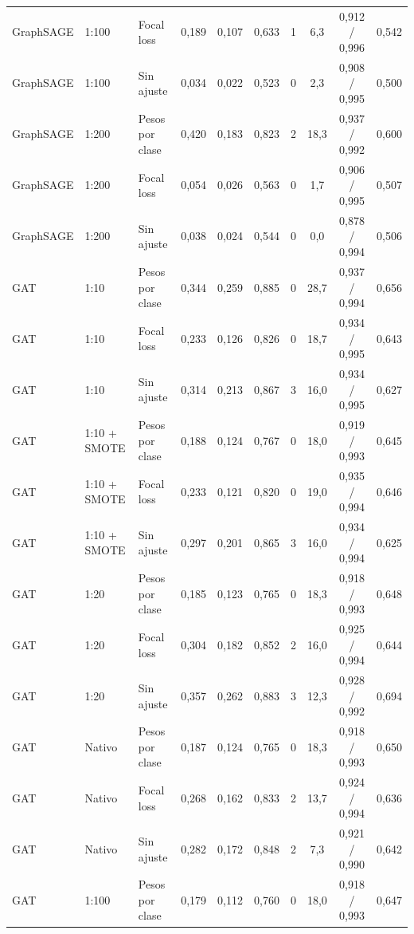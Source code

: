 \begin{longtable}{lllccccccc}
GraphSAGE & 1:100 & Focal loss & 0{,}189 & 0{,}107 & 0{,}633 & 1 & 6{,}3 & 0{,}912 / 0{,}996 & 0{,}542 \\
GraphSAGE & 1:100 & Sin ajuste & 0{,}034 & 0{,}022 & 0{,}523 & 0 & 2{,}3 & 0{,}908 / 0{,}995 & 0{,}500 \\
GraphSAGE & 1:200 & Pesos por clase & 0{,}420 & 0{,}183 & 0{,}823 & 2 & 18{,}3 & 0{,}937 / 0{,}992 & 0{,}600 \\
GraphSAGE & 1:200 & Focal loss & 0{,}054 & 0{,}026 & 0{,}563 & 0 & 1{,}7 & 0{,}906 / 0{,}995 & 0{,}507 \\
GraphSAGE & 1:200 & Sin ajuste & 0{,}038 & 0{,}024 & 0{,}544 & 0 & 0{,}0 & 0{,}878 / 0{,}994 & 0{,}506 \\
\midrule
GAT & 1:10 & Pesos por clase & 0{,}344 & 0{,}259 & 0{,}885 & 0 & 28{,}7 & 0{,}937 / 0{,}994 & 0{,}656 \\
GAT & 1:10 & Focal loss & 0{,}233 & 0{,}126 & 0{,}826 & 0 & 18{,}7 & 0{,}934 / 0{,}995 & 0{,}643 \\
GAT & 1:10 & Sin ajuste & 0{,}314 & 0{,}213 & 0{,}867 & 3 & 16{,}0 & 0{,}934 / 0{,}995 & 0{,}627 \\
GAT & 1:10 + SMOTE & Pesos por clase & 0{,}188 & 0{,}124 & 0{,}767 & 0 & 18{,}0 & 0{,}919 / 0{,}993 & 0{,}645 \\
GAT & 1:10 + SMOTE & Focal loss & 0{,}233 & 0{,}121 & 0{,}820 & 0 & 19{,}0 & 0{,}935 / 0{,}994 & 0{,}646 \\
GAT & 1:10 + SMOTE & Sin ajuste & 0{,}297 & 0{,}201 & 0{,}865 & 3 & 16{,}0 & 0{,}934 / 0{,}994 & 0{,}625 \\
GAT & 1:20 & Pesos por clase & 0{,}185 & 0{,}123 & 0{,}765 & 0 & 18{,}3 & 0{,}918 / 0{,}993 & 0{,}648 \\
GAT & 1:20 & Focal loss & 0{,}304 & 0{,}182 & 0{,}852 & 2 & 16{,}0 & 0{,}925 / 0{,}994 & 0{,}644 \\
GAT & 1:20 & Sin ajuste & 0{,}357 & 0{,}262 & 0{,}883 & 3 & 12{,}3 & 0{,}928 / 0{,}992 & 0{,}694 \\
GAT & Nativo & Pesos por clase & 0{,}187 & 0{,}124 & 0{,}765 & 0 & 18{,}3 & 0{,}918 / 0{,}993 & 0{,}650 \\
GAT & Nativo & Focal loss & 0{,}268 & 0{,}162 & 0{,}833 & 2 & 13{,}7 & 0{,}924 / 0{,}994 & 0{,}636 \\
GAT & Nativo & Sin ajuste & 0{,}282 & 0{,}172 & 0{,}848 & 2 & 7{,}3 & 0{,}921 / 0{,}990 & 0{,}642 \\
GAT & 1:100 & Pesos por clase & 0{,}179 & 0{,}112 & 0{,}760 & 0 & 18{,}0 & 0{,}918 / 0{,}993 & 0{,}647 \\

\end{longtable}
